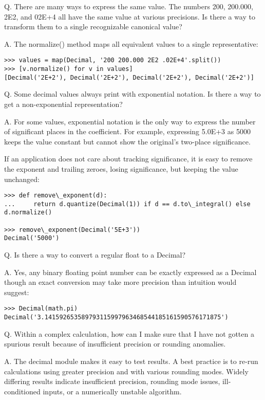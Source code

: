 Q. There are many ways to express the same value. The numbers 200, 200.000, 2E2, and 02E+4 all have the same value at various precisions. Is there a way to transform them to a single recognizable canonical value?

A. The normalize() method maps all equivalent values to a single representative:

\begin{lstlisting}
>>> values = map(Decimal, '200 200.000 2E2 .02E+4'.split())
>>> [v.normalize() for v in values]
[Decimal('2E+2'), Decimal('2E+2'), Decimal('2E+2'), Decimal('2E+2')]
\end{lstlisting}

Q. Some decimal values always print with exponential notation. Is there a way to get a non-exponential representation?

A. For some values, exponential notation is the only way to express the number of significant places in the coefficient. For example, expressing 5.0E+3 as 5000 keeps the value constant but cannot show the original's two-place significance.

If an application does not care about tracking significance, it is easy to remove the exponent and trailing zeroes, losing significance, but keeping the value unchanged:

\begin{lstlisting}
>>> def remove\_exponent(d):
...     return d.quantize(Decimal(1)) if d == d.to\_integral() else d.normalize()

>>> remove\_exponent(Decimal('5E+3'))
Decimal('5000')
\end{lstlisting}

Q. Is there a way to convert a regular float to a Decimal?

A. Yes, any binary floating point number can be exactly expressed as a Decimal though an exact conversion may take more precision than intuition would suggest:

\begin{lstlisting}
>>> Decimal(math.pi)
Decimal('3.141592653589793115997963468544185161590576171875')
\end{lstlisting}

Q. Within a complex calculation, how can I make sure that I have not gotten a spurious result because of insufficient precision or rounding anomalies.

A. The decimal module makes it easy to test results. A best practice is to re-run calculations using greater precision and with various rounding modes. Widely differing results indicate insufficient precision, rounding mode issues, ill-conditioned inputs, or a numerically unstable algorithm.

